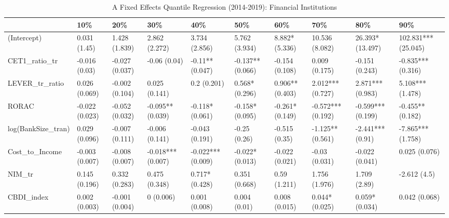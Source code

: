 \begin{table}[ht]
\centering
\caption{A Fixed Effects Quantile Regression (2014-2019): Financial Institutions} 
\begingroup\small
\begin{tabular}{llllllllll}
  \toprule
 & 10\% & 20\% & 30\% & 40\% & 50\% & 60\% & 70\% & 80\% & 90\% \\ 
  \midrule
(Intercept) & 0.031 (1.45) & 1.428 (1.839) & 2.862 (2.272) & 3.734 (2.856) & 5.762 (3.934) & 8.882* (5.336) & 10.536 (8.082) & 26.393* (13.497) & 102.831*** (25.045) \\ 
  CET1\_ratio\_tr & -0.016 (0.03) & -0.027 (0.037) & -0.06 (0.04) & -0.11** (0.047) & -0.137** (0.066) & -0.154 (0.108) & 0.009 (0.175) & -0.151 (0.243) & -0.835*** (0.316) \\ 
  LEVER\_tr\_ratio & 0.026 (0.069) & -0.002 (0.104) & 0.025 (0.141) & 0.2 (0.201) & 0.568* (0.296) & 0.906** (0.403) & 2.012*** (0.727) & 2.871*** (0.983) & 5.108*** (1.478) \\ 
  RORAC & -0.022 (0.023) & -0.052 (0.032) & -0.095** (0.039) & -0.118* (0.061) & -0.158* (0.095) & -0.261* (0.149) & -0.572*** (0.192) & -0.599*** (0.199) & -0.455** (0.182) \\ 
  log(BankSize\_tran) & 0.029 (0.096) & -0.007 (0.111) & -0.006 (0.141) & -0.043 (0.191) & -0.25 (0.26) & -0.515 (0.35) & -1.125** (0.561) & -2.441*** (0.91) & -7.865*** (1.758) \\ 
  Cost\_to\_Income & -0.003 (0.007) & -0.008 (0.007) & -0.018*** (0.007) & -0.022*** (0.009) & -0.022* (0.013) & -0.022 (0.021) & -0.03 (0.031) & -0.022 (0.041) & 0.025 (0.076) \\ 
  NIM\_tr & 0.145 (0.196) & 0.332 (0.283) & 0.475 (0.348) & 0.717* (0.428) & 0.351 (0.668) & 0.59 (1.211) & 1.756 (1.976) & 1.709 (2.89) & -2.612 (4.5) \\ 
  CBDI\_index & 0.002 (0.003) & -0.001 (0.004) & 0 (0.006) & 0.001 (0.008) & 0.004 (0.01) & 0.008 (0.015) & 0.044* (0.025) & 0.059* (0.034) & 0.042 (0.068) \\ 
   \bottomrule
\end{tabular}
\endgroup
\end{table}
